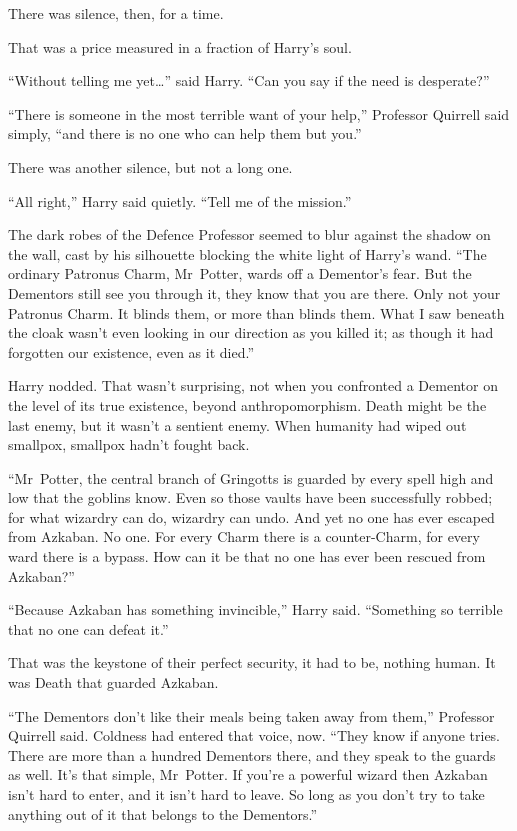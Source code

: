 There was silence, then, for a time.

That was a price measured in a fraction of Harry’s soul.

“Without telling me yet…” said Harry. “Can you say if the need is desperate?”

“There is someone in the most terrible want of your help,” Professor Quirrell said simply, “and there is no one who can help them but you.”

There was another silence, but not a long one.

“All right,” Harry said quietly. “Tell me of the mission.”

The dark robes of the Defence Professor seemed to blur against the shadow on the wall, cast by his silhouette blocking the white light of Harry’s wand. “The ordinary Patronus Charm, Mr~Potter, wards off a Dementor’s fear. But the Dementors still see you through it, they know that you are there. Only not your Patronus Charm. It blinds them, or more than blinds them. What I saw beneath the cloak wasn’t even looking in our direction as you killed it; as though it had forgotten our existence, even as it died.”

Harry nodded. That wasn’t surprising, not when you confronted a Dementor on the level of its true existence, beyond anthropomorphism. Death might be the last enemy, but it wasn’t a sentient enemy. When humanity had wiped out smallpox, smallpox hadn’t fought back.

“Mr~Potter, the central branch of Gringotts is guarded by every spell high and low that the goblins know. Even so those vaults have been successfully robbed; for what wizardry can do, wizardry can undo. And yet no one has ever escaped from Azkaban. No one. For every Charm there is a counter-Charm, for every ward there is a bypass. How can it be that no one has ever been rescued from Azkaban?”

“Because Azkaban has something invincible,” Harry said. “Something so terrible that no one can defeat it.”

That was the keystone of their perfect security, it had to be, nothing human. It was Death that guarded Azkaban.

“The Dementors don’t like their meals being taken away from them,” Professor Quirrell said. Coldness had entered that voice, now. “They know if anyone tries. There are more than a hundred Dementors there, and they speak to the guards as well. It’s that simple, Mr~Potter. If you’re a powerful wizard then Azkaban isn’t hard to enter, and it isn’t hard to leave. So long as you don’t try to take anything out of it that belongs to the Dementors.”

